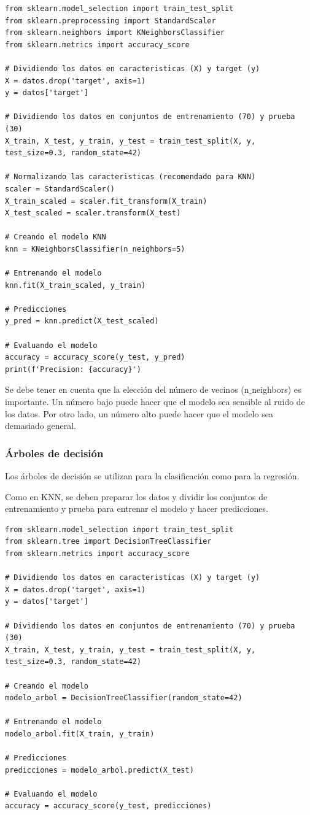 \documentclass[a4paper, 12pt]{book}
\begin{document}
\begin{verbatim}
from sklearn.model_selection import train_test_split
from sklearn.preprocessing import StandardScaler
from sklearn.neighbors import KNeighborsClassifier
from sklearn.metrics import accuracy_score
	
# Dividiendo los datos en caracteristicas (X) y target (y)
X = datos.drop('target', axis=1)
y = datos['target']
	
# Dividiendo los datos en conjuntos de entrenamiento (70) y prueba (30)
X_train, X_test, y_train, y_test = train_test_split(X, y, test_size=0.3, random_state=42)
	
# Normalizando las caracteristicas (recomendado para KNN)
scaler = StandardScaler()
X_train_scaled = scaler.fit_transform(X_train)
X_test_scaled = scaler.transform(X_test)
	
# Creando el modelo KNN
knn = KNeighborsClassifier(n_neighbors=5)
	
# Entrenando el modelo
knn.fit(X_train_scaled, y_train)
	
# Predicciones
y_pred = knn.predict(X_test_scaled)
	
# Evaluando el modelo
accuracy = accuracy_score(y_test, y_pred)
print(f'Precision: {accuracy}')
\end{verbatim}

Se debe tener en cuenta que la elección del número de vecinos (n$\_$neighbors) es importante. Un número bajo puede hacer que el modelo sea sensible al ruido de los datos. Por otro lado, un número alto puede hacer que el modelo sea demasiado general.

\subsubsection{Árboles de decisión}
Los árboles de decisión se utilizan para la clasificación como para la regresión.

Como en KNN, se deben preparar los datos y dividir los conjuntos de entrenamiento y prueba para entrenar el modelo y hacer predicciones.
\begin{verbatim}
from sklearn.model_selection import train_test_split
from sklearn.tree import DecisionTreeClassifier
from sklearn.metrics import accuracy_score

# Dividiendo los datos en caracteristicas (X) y target (y)
X = datos.drop('target', axis=1)
y = datos['target']

# Dividiendo los datos en conjuntos de entrenamiento (70) y prueba (30)
X_train, X_test, y_train, y_test = train_test_split(X, y, test_size=0.3, random_state=42)

# Creando el modelo
modelo_arbol = DecisionTreeClassifier(random_state=42)

# Entrenando el modelo
modelo_arbol.fit(X_train, y_train)

# Predicciones
predicciones = modelo_arbol.predict(X_test)

# Evaluando el modelo
accuracy = accuracy_score(y_test, predicciones)
\end{verbatim}
\end{document}
